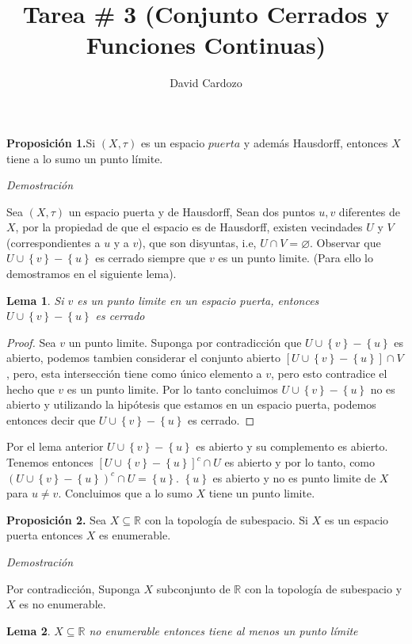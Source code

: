 \documentclass[]{article}
\author{David Cardozo}
\title{Tarea \# 3 (Conjunto Cerrados y Funciones Continuas)}
\newtheorem{lem}{Lema}
\newcommand{\set}[1]{\left\lbrace #1 \right\rbrace}
\newcommand{\RR}{\mathbb{R}}
\newcommand{\contained}{\subseteq}
\begin{document}
\maketitle
\textbf{Proposición 1.}Si $(X,\tau)$ es un espacio $puerta$ y además Hausdorff, entonces $X$ tiene a lo sumo un punto límite.

\textit{Demostración}

Sea $ (X,\tau) $ un espacio puerta y de Hausdorff, Sean dos puntos $u,v$ diferentes de $X$, por la propiedad de que el espacio es de Hausdorff, existen vecindades $U$ y $V$ (correspondientes a $ u $ y a $v$), que son disyuntas, i.e, $ U \cap V = \varnothing$. Observar que $ U \cup \set{v} - \set{u} $ es cerrado siempre que $ v $ es un punto limite. (Para ello lo demostramos en el siguiente lema).

\begin{lem}
	Si $ v $ es un punto limite en un espacio puerta, entonces $ U \cup \set{v} - \set{u} $ es cerrado
\end{lem}
\begin{proof}
	Sea $v$ un punto limite. Suponga por contradicción que $ U \cup \set{v} - \set{u} $ es abierto, podemos tambien considerar el conjunto abierto $  [U \cup \set{v} - \set{u}] \cap V $, pero, esta intersección tiene como único elemento a $v$,  pero esto contradice el hecho que $v$ es un punto limite. Por lo tanto concluimos  $ U \cup \set{v} - \set{u} $ no es abierto y utilizando la hipótesis que estamos en un espacio puerta, podemos entonces decir que  $ U \cup \set{v} - \set{u} $ es cerrado.
\end{proof}

Por el lema anterior  $ U \cup \set{v} - \set{u} $ es abierto y su complemento es abierto. Tenemos entonces  $[ U \cup \set{v} - \set{u} ]^c \cap U$ es abierto y por lo tanto, como  $ (U \cup \set{v} - \set{u})^c \cap U = \set{u} $. $ \set{u} $ es abierto y no es punto limite de $X$ para $ u \neq v$. Concluimos que a lo sumo $X$ tiene un punto limite.
\qedsymbol

\textbf{Proposición 2.} Sea $X\subseteq \mathbb{R}$ con la topología de subespacio. Si $X$ es un espacio puerta entonces $X$ es enumerable.

\textit{Demostración}

Por contradicción, Suponga $X$ subconjunto de $\RR$ con la topología de subespacio y $X$ es no enumerable. 

\begin{lem}
	$X \contained \RR$ no enumerable entonces tiene al menos un punto límite
\end{lem}
\end{document}

